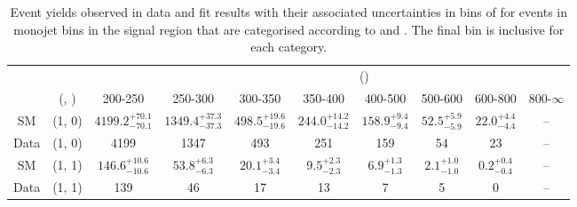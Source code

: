 \begin{table}[h!]
\tiny
\centering
\caption{Event yields observed in data and fit results with their associated uncertainties in bins of \scalht for events in monojet bins in the signal region that are categorised according to \njet and \nb.
The final \scalht bin is inclusive for each category. \label{tab:yieldsewkdatapost_sig_comb_mono}}
\begin{tabular}
{cccccccccc}
	\hline\hline
&	&	& \multicolumn{8}{c}{\scalht (\gev)}\\ 
	&	 (\njet, \nb) & 200-250 & 250-300 & 300-350 & 350-400 & 400-500 & 500-600 & 600-800 & 800-$\infty$ \\ [0.8ex] 
\hline
	SM & (1, 0) & $4199.2^{+ 70.1 }_{- 70.1 }$ & $1349.4^{+ 37.3 }_{- 37.3 }$ & $498.5^{+ 19.6 }_{- 19.6 }$ & $244.0^{+ 14.2 }_{- 14.2 }$ & $158.9^{+ 9.4 }_{- 9.4 }$ & $52.5^{+ 5.9 }_{- 5.9 }$ & $22.0^{+ 4.4 }_{- 4.4 }$ & -- \\[0.5ex] 
	Data & (1, 0) & 4199 & 1347 & 493 & 251 & 159 & 54 & 23 & -- \\[0.5ex] 
	SM & (1, 1) & $146.6^{+ 10.6 }_{- 10.6 }$ & $53.8^{+ 6.3 }_{- 6.3 }$ & $20.1^{+ 3.4 }_{- 3.4 }$ & $9.5^{+ 2.3 }_{- 2.3 }$ & $6.9^{+ 1.3 }_{- 1.3 }$ & $2.1^{+ 1.0 }_{- 1.0 }$ & $0.2^{+ 0.4 }_{- 0.4 }$ & -- \\[0.5ex] 
	Data & (1, 1) & 139 & 46 & 17 & 13 & 7 & 5 & 0 & -- \\[0.5ex] 
	\hline
	\hline
\end{tabular}
\end{table}

